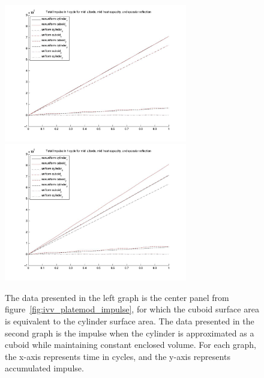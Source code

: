 \begin{description}
     \begin{figure}[!ht]
     \includegraphics[width=80mm]{figs/Plate_mod/I_alb_mid__HC_mid__ref_spc.jpg}
     \includegraphics[width=80mm]{figs/Plate_mod/I_alb_mid__HC_mid_ref_spc2.jpg}
     \caption{The data presented in the left graph is the center panel from
     figure~\ref{fig:ivv_platemod_impulse}, for which the cuboid surface area
     is equivalent to the cylinder surface area.  The data presented in the
     second graph is the impulse when the cylinder is approximated as a
     cuboid while maintaining constant enclosed volume.  For each graph, the x-axis represents time in cycles, and the y-axis represents accumulated impulse.}
     \label{fig:ivv_platemod_size}
     \end{figure}
  \end{description}

